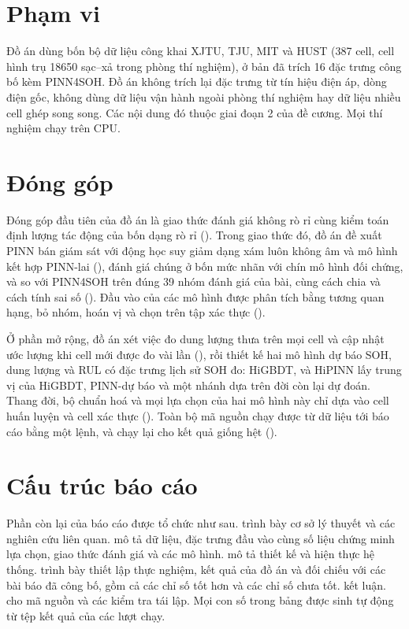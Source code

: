 \section{Phạm vi}

Đồ án dùng bốn bộ dữ liệu công khai XJTU, TJU, MIT và HUST (387 cell, cell hình trụ 18650 sạc--xả trong phòng thí
nghiệm), ở bản đã trích 16 đặc trưng công bố kèm PINN4SOH. Đồ án không trích lại đặc trưng từ tín hiệu điện áp, dòng
điện gốc, không dùng dữ liệu vận hành ngoài phòng thí nghiệm hay dữ liệu nhiều cell ghép song song. Các nội dung đó
thuộc giai đoạn 2 của đề cương. Mọi thí nghiệm chạy trên CPU.

\section{Đóng góp}

Đóng góp đầu tiên của đồ án là giao thức đánh giá không rò rỉ cùng kiểm toán định lượng tác động của bốn dạng rò rỉ
(). Trong giao thức đó, đồ án đề xuất PINN bán giám sát với động học suy giảm dạng xám
luôn không âm và mô hình kết hợp PINN-lai (), đánh giá chúng ở bốn mức nhãn với chín mô hình
đối chứng, và so với PINN4SOH trên đúng 39 nhóm đánh giá của bài, cùng cách chia và cách tính sai số
(). Đầu vào của các mô hình được phân tích bằng tương quan hạng, bỏ nhóm, hoán vị và chọn trên tập xác
thực ().

Ở phần mở rộng, đồ án xét việc đo dung lượng thưa trên mọi cell và cập nhật ước lượng khi cell mới được đo vài lần
(), rồi thiết kế hai mô hình dự báo SOH, dung lượng và RUL có đặc trưng lịch sử SOH đo: HiGBDT, và
HiPINN lấy trung vị của HiGBDT, PINN-dự báo và một nhánh dựa trên đời còn lại dự đoán. Thang đời, bộ chuẩn hoá và mọi
lựa chọn của hai mô hình này chỉ dựa vào cell huấn luyện và cell xác thực (). Toàn bộ mã nguồn chạy được
từ dữ liệu tới báo cáo bằng một lệnh, và chạy lại cho kết quả giống hệt ().

\section{Cấu trúc báo cáo}

Phần còn lại của báo cáo được tổ chức như sau.  trình bày cơ sở lý thuyết và các nghiên cứu liên
quan.  mô tả dữ liệu, đặc trưng đầu vào cùng số liệu chứng minh lựa chọn, giao thức đánh giá và
các mô hình.  mô tả thiết kế và hiện thực hệ thống.  trình bày thiết
lập thực nghiệm, kết quả của đồ án và đối chiếu với các bài báo đã công bố, gồm cả các chỉ
số tốt hơn và các chỉ số chưa tốt.  kết luận.  cho mã nguồn và các kiểm
tra tái lập. Mọi con số trong bảng được sinh tự động từ tệp kết quả
của các lượt chạy.
